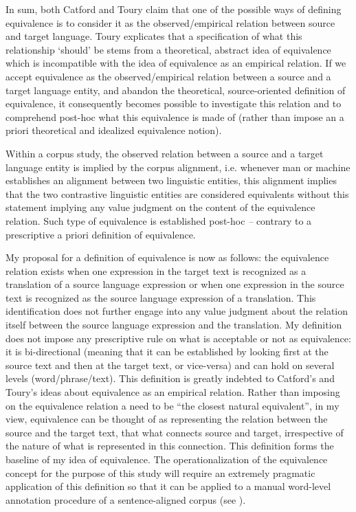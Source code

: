 In sum, both Catford and Toury claim that one of the possible ways of defining equivalence is to consider it as the observed/empirical relation between source and target language. Toury explicates that a specification of what this relationship ‘should’ be stems from a theoretical, abstract idea of equivalence which is incompatible with the idea of equivalence as an empirical relation. If we accept equivalence as the observed/empirical relation between a source and a target language entity, and abandon the theoretical, source-oriented definition of equivalence, it consequently becomes possible to investigate this relation and to comprehend post-hoc what this equivalence is made of (rather than impose an a priori theoretical and idealized equivalence notion).

Within a corpus study, the observed relation between a source and a target language entity is implied by the corpus alignment, i.e. whenever man or machine establishes an alignment between two linguistic entities, this alignment implies that the two contrastive linguistic entities are considered equivalents without this statement implying any value judgment on the content of the equivalence relation. Such type of equivalence is established post-hoc \textit{–} contrary to a prescriptive a priori definition of equivalence.

My proposal for a definition of equivalence is now as follows: the equivalence relation exists when one expression in the target text is recognized as a translation of a source language expression or when one expression in the source text is recognized as the source language expression of a translation. This identification does not further engage into any value judgment about the relation itself between the source language expression and the translation. My definition does not impose any prescriptive rule on what is acceptable or not as equivalence: it is bi-directional (meaning that it can be established by looking first at the source text and then at the target text, or vice-versa) and can hold on several levels (word/phrase/text). This definition is greatly indebted to Catford’s and Toury’s ideas about equivalence as an empirical relation. Rather than imposing on the equivalence relation a need to be “the closest natural equivalent”, in my view, equivalence can be thought of as representing the relation between the source and the target text, that what connects source and target, irrespective of the nature of what is represented in this connection. This definition forms the baseline of my idea of equivalence. The operationalization of the equivalence concept for the purpose of this study will require an extremely pragmatic application of this definition so that it can be applied to a manual word-level annotation procedure of a sentence-aligned corpus (see ).

